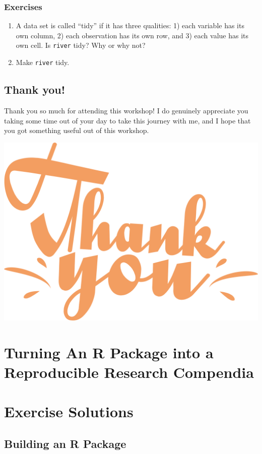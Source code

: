 \documentclass[
]{book}
\begin{document}
\hypertarget{ex-set14}{%
\subsection{Exercises}\label{ex-set14}}

\begin{enumerate}
\def\labelenumi{\arabic{enumi}.}
\item
  A data set is called ``tidy'' if it has three qualities: 1) each variable has its own column, 2) each observation has its own row, and 3) each value has its own cell. Is \texttt{river} tidy? Why or why not?
\item
  Make \texttt{river} tidy.
\end{enumerate}

\hypertarget{thank-you}{%
\section{Thank you!}\label{thank-you}}

Thank you so much for attending this workshop! I do genuinely appreciate you taking some time out of your day to take this journey with me, and I hope that you got something useful out of this workshop.

\begin{center}\includegraphics[width=0.5\linewidth]{images/thank_you} \end{center}

\hypertarget{your-compendia}{%
\chapter{Turning An R Package into a Reproducible Research Compendia}\label{your-compendia}}

\hypertarget{exercise-solutions}{%
\chapter{Exercise Solutions}\label{exercise-solutions}}

\hypertarget{building-an-r-package}{%
\section*{Building an R Package}\label{building-an-r-package}}
\end{document}
